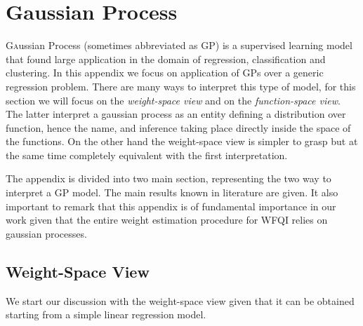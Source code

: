 \chapter{Gaussian Process}
  \lettrine[lines=2]{G}aussian Process (sometimes abbreviated as GP) is a supervised learning model that found large application
  in the domain of regression, classification and clustering. In this appendix we focus on application
  of GPs over a generic regression problem.\newline
  There are many ways to interpret this type of model, for this section we will focus on the \textit{weight-space view} and
  on the \textit{function-space view}. The latter interpret a gaussian process as an entity defining a distribution over
  function, hence the name, and inference taking place directly inside the space of the functions. On the other hand the
  weight-space view is simpler to grasp  but at the same time completely equivalent with the first interpretation.\newline

  \noindent The appendix is divided into two main section, representing the two way to interpret a GP model. The main results
  known in literature are given. It also important to remark that this appendix is of fundamental importance in our work
  given that the entire weight estimation procedure for WFQI relies on gaussian processes.

  \section{Weight-Space View}
    \noindent We start our discussion with the weight-space view given that it can be obtained starting from a
    simple linear regression model.
